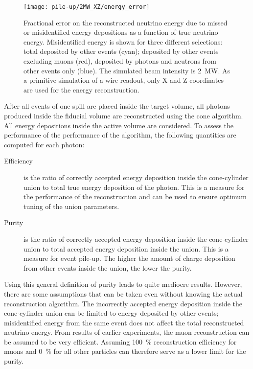 \begin{figure}[htb]
	\centering
	\texttt{[image: pile-up/2MW\_XZ/energy\_error]}
	\caption{Fractional error on the reconstructed neutrino energy due to missed or misidentified energy depositions as a function of true neutrino energy.
	Misidentified energy is shown for three different selections: total deposited by other events (cyan); deposited by other events excluding muons (red), deposited by photons and neutrons from other events only (blue).
	The simulated beam intensity is \SI{2}{\mega\watt}.
	As a primitive simulation of a wire readout, only X and Z coordinates are used for the energy reconstruction.}
	\label{fig:dune-nd_2MW-XZ-energy-error}
\end{figure}

After all events of one spill are placed inside the target volume, all \Pgpz photons produced inside the fiducial volume are reconstructed using the cone algorithm.
All energy depositions inside the active volume are considered.
To assess the performance of the performance of the algorithm, the following quantities are computed for each photon:
\begin{description}
	\item[Efficiency] is the ratio of correctly accepted energy deposition inside the cone-cylinder union to total true energy deposition of the photon.
		This is a measure for the performance of the reconstruction and can be used to ensure optimum tuning of the union parameters.
	\item[Purity] is the ratio of correctly accepted energy deposition inside the cone-cylinder union to total accepted energy deposition inside the union.
		This is a measure for event pile-up.
		The higher the amount of charge deposition from other events inside the union, the lower the purity.
\end{description}
Using this general definition of purity leads to quite mediocre results.
However, there are some assumptions that can be taken even without knowing the actual reconstruction algorithm.
The incorrectly accepted energy deposition inside the cone-cylinder union can be limited to energy deposited by other events; misidentified energy from the same event does not affect the total reconstructed neutrino energy.
From results of earlier experiments, the muon reconstruction can be assumed to be very efficient.
Assuming \SI{100}{\percent} reconstruction efficiency for muons and \SI{0}{\percent} for all other particles can therefore serve as a lower limit for the purity.
